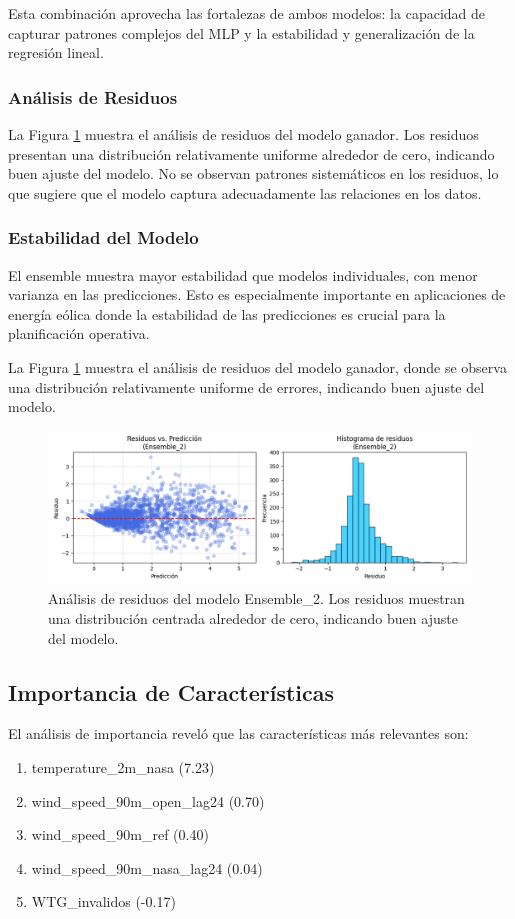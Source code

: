 \documentclass[conference]{IEEEtran}
\begin{document}
	Esta combinación aprovecha las fortalezas de ambos modelos: la capacidad de capturar patrones complejos del MLP y la estabilidad y generalización de la regresión lineal.
	
	\subsubsection{Análisis de Residuos}
	La Figura \ref{fig:residuos_mejor_modelo} muestra el análisis de residuos del modelo ganador. Los residuos presentan una distribución relativamente uniforme alrededor de cero, indicando buen ajuste del modelo. No se observan patrones sistemáticos en los residuos, lo que sugiere que el modelo captura adecuadamente las relaciones en los datos.
	
	\subsubsection{Estabilidad del Modelo}
	El ensemble muestra mayor estabilidad que modelos individuales, con menor varianza en las predicciones. Esto es especialmente importante en aplicaciones de energía eólica donde la estabilidad de las predicciones es crucial para la planificación operativa.
	
	La Figura \ref{fig:residuos_mejor_modelo} muestra el análisis de residuos del modelo ganador, donde se observa una distribución relativamente uniforme de errores, indicando buen ajuste del modelo.
	
	\begin{figure}[htbp]
		\centering
		\includegraphics[width=0.9\linewidth]{images/Figure_3.png}
		\caption{Análisis de residuos del modelo Ensemble\_2. Los residuos muestran una distribución centrada alrededor de cero, indicando buen ajuste del modelo.}
		\label{fig:residuos_mejor_modelo}
	\end{figure}
	
	\subsection{Importancia de Características}
	El análisis de importancia reveló que las características más relevantes son:
	\begin{enumerate}
		\item temperature\_2m\_nasa (7.23)
		\item wind\_speed\_90m\_open\_lag24 (0.70)
		\item wind\_speed\_90m\_ref (0.40)
		\item wind\_speed\_90m\_nasa\_lag24 (0.04)
		\item WTG\_invalidos (-0.17)
	\end{enumerate}
	
\end{document}
